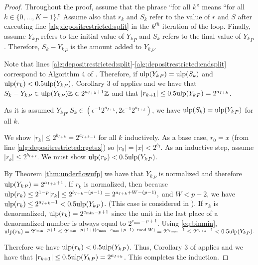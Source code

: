       \begin{proof}
        Throughout the proof, assume that the phrase ``for all $k$'' means
        ``for all $k \in \{0, ..., K - 1\}$.'' Assume also that $r_k$ and $S_k$
        refer to the value of $r$ and $S$ after executing line
        \ref{alg:depositrestricted:split} in the $k^{th}$ iteration of the
        loop. Finally, assume ${Y_k}_P$ refers to the initial value of
        ${Y_k}_P$ and $S_k$ refers to the final value of ${Y_k}_P$. Therefore,
        $S_k - {Y_k}_P$ is the amount added to ${Y_k}_P$.

        Note that lines
        \ref{alg:depositrestricted:split}-\ref{alg:depositrestricted:endsplit}
        correspond to Algorithm 4 of \cite{repsum}.  Therefore, if
        $\text{ulp}({Y_k}_P) = \text{ulp}(S_k)$ and $\text{ulp}(r_k) < 0.5\text{ulp}({Y_k}_P)$,
        Corollary 3 of \cite{repsum} applies and we have that
        $S_k - {Y_k}_P \in \text{ulp}({Y_k}_P)\mathbb{Z} \in 2^{a_{I + k} + 1}\mathbb{Z}$
        and that $|r_{k + 1}| \leq 0.5\text{ulp}({Y_k}_P) = 2^{a_{I + k}}$.

        As it is assumed
        ${Y_k}_P, S_k \in (\epsilon^{-1}  2^{a_{I + k}}, 2  \epsilon^{-1}  2^{a_{I + k}})$,
        we have $\text{ulp}(S_k) = \text{ulp}({Y_k}_P)$ for all $k$.

        We show $|r_k| \leq 2^{b_{I + k}} = 2^{a_{I + k - 1}}$ for all $k$ inductively.
        As a base case, $r_0 = x$ (from line \ref{alg:depositrestricted:rgetsx}) so $|r_0| = |x| < 2^{b_{I}}$.
        As an inductive step, assume $|r_k| \leq 2^{b_{I + k}}$. We must show $\text{ulp}(r_k) < 0.5\text{ulp}({Y_k}_P)$.

        By Theorem \ref{thm:underflowufp} we have that ${Y_k}_P$ is normalized
        and therefore $\text{ulp}({Y_k}_P) = 2^{a_{I + k} + 1}$.
        If $r_k$ is normalized, then because 
        \(
            \text{ulp}(r_k) \leq 2^{1 - p}|r_k| \leq 2^{b_{I + k} - (p - 1)} = 2^{a_{I + k} + W - (p - 1)},
        \)
        and $W < p - 2$, we have $\text{ulp}(r_k) \leq 2^{a_{I + k} - 1} < 0.5\text{ulp}({Y_k}_P)$.
        (This case is considered in \cite{repsum}).
        If $r_k$ is denormalized, $\text{ulp}(r_k) = 2^{e_{\text{min}} - p + 1}$
        since the unit in the last place of a denormalized number is always equal to $2^{e_{\min} - p + 1}$.
        Using \eqref{eq:binmin},
        \(
            \text{ulp}(r_k)
                = 2^{e_{\text{min}} - p + 1} \leq 2^{e_{\text{min}} - p + 1 + ((e_{\text{max}} - e_{\text{min}} + p - 1) \mod W)}
                = 2^{a_{i_{\text{max}}} - 1} \leq 2^{a_{I + k} - 1} < 0.5\text{ulp}({Y_k}_P).
        \)

        Therefore we have $\text{ulp}(r_k) < 0.5\text{ulp}({Y_k}_P)$. Thus, Corollary 3 of
        \cite{repsum} applies and we have that $|r_{k + 1}| \leq
        0.5\text{ulp}({Y_k}_P) = 2^{a_{I + k}}$. This completes the induction.


\end{proof}
